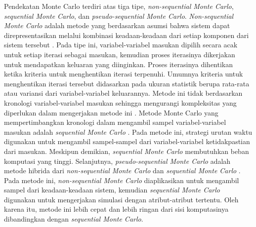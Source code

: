 {{Pendekatan Monte Carlo terdiri atas tiga tipe, \textit{non-sequential Monte Carlo}, \textit{sequential Monte Carlo}, dan \textit{pseudo-sequential Monte Carlo}. \textit{Non-sequential Monte Carlo} adalah metode yang berdasarkan asumsi bahwa sistem dapat direpresentasikan melalui kombinasi keadaan-keadaan dari setiap komponen dari sistem tersebut \cite{Tao2018}. Pada tipe ini, variabel-variabel masukan dipilih secara acak untuk setiap iterasi sebagai masukan, kemudian proses iterasinya dikerjakan untuk mendapatkan keluaran yang diinginkan. Proses iterasinya dihentikan ketika kriteria untuk menghentikan iterasi terpenuhi. Umumnya kriteria untuk menghentikan iterasi tersebut didasarkan pada ukuran statistik berupa rata-rata atau variansi dari variabel-variabel keluarannya. Metode ini tidak berdasarkan kronologi variabel-variabel masukan sehingga mengurangi kompleksitas yang diperlukan dalam mengerjakan metode ini \cite{Vallee2013}. Metode Monte Carlo yang mempertimbangkan kronologi dalam mengambil sampel variabel-variabel masukan adalah \textit{sequential Monte Carlo} \cite{Arun2009}. Pada metode ini, strategi urutan waktu digunakan untuk mengambil sampel-sampel dari variabel-variabel ketidakpastian dari masukan. Meskipun demikian, \textit{sequential Monte Carlo} membutuhkan beban komputasi yang tinggi\cite{Zio2015}. Selanjutnya, \textit{pseudo-sequential Monte Carlo} adalah metode hibrida dari \textit{non-sequential Monte Carlo} dan \textit{sequential Monte Carlo} \cite{Billinton1994}. Pada metode ini, \textit{non-sequential Monte Carlo} diaplikasikan untuk mengambil sampel dari keadaan-keadaan sistem, kemudian \textit{sequential Monte Carlo} digunakan untuk mengerjakan simulasi dengan atribut-atribut tertentu. Oleh karena itu, metode ini lebih cepat dan lebih ringan dari sisi komputasinya dibandingkan dengan \textit{sequential Monte Carlo}\cite{Zhao2014}. 

}}
